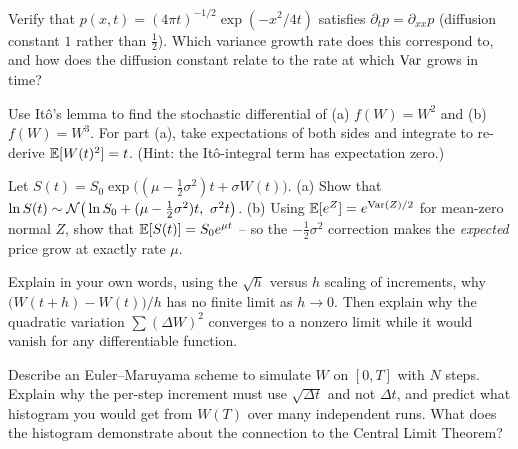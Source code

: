 \begin{exercise}
Verify that $p(x,t)=(4\pi t)^{-1/2}\exp(-x^2/4t)$ satisfies
$\partial_t p = \partial_{xx}p$ (diffusion constant $1$ rather than $\tfrac12$).
Which variance growth rate does this correspond to, and how does the diffusion
constant relate to the rate at which $\operatorname{Var}$ grows in time?
\end{exercise}

\begin{exercise}
Use It\^o's lemma to find the stochastic differential of (a) $f(W)=W^2$ and
(b) $f(W)=W^3$. For part (a), take expectations of both sides and integrate to
re-derive $\operatorname{\mathbb{E}}[W(t)^2]=t$. (Hint: the It\^o-integral term has expectation zero.)
\end{exercise}

\begin{exercise}
Let $S(t)=S_0\exp\big((\mu-\tfrac12\sigma^2)t+\sigma W(t)\big)$. (a) Show that
$\ln S(t)\sim\mathcal{N}\big(\ln S_0 + (\mu-\tfrac12\sigma^2)t,\ \sigma^2 t\big)$.
(b) Using $\operatorname{\mathbb{E}}[e^{Z}] = e^{\operatorname{Var}(Z)/2}$ for mean-zero normal $Z$, show that
$\operatorname{\mathbb{E}}[S(t)] = S_0 e^{\mu t}$ -- so the $-\tfrac12\sigma^2$ correction makes the
\emph{expected} price grow at exactly rate $\mu$.
\end{exercise}

\begin{exercise}
Explain in your own words, using the $\sqrt h$ versus $h$ scaling of increments,
why $\big(W(t+h)-W(t)\big)/h$ has no finite limit as $h\to0$. Then explain why the
quadratic variation $\sum (\Delta W)^2$ converges to a nonzero limit while it
would vanish for any differentiable function.
\end{exercise}

\begin{exercise}
Describe an Euler--Maruyama scheme to simulate $W$ on $[0,T]$ with $N$ steps.
Explain why the per-step increment must use $\sqrt{\Delta t}$ and not $\Delta t$,
and predict what histogram you would get from $W(T)$ over many independent runs.
What does the histogram demonstrate about the connection to the Central Limit
Theorem?
\end{exercise}
